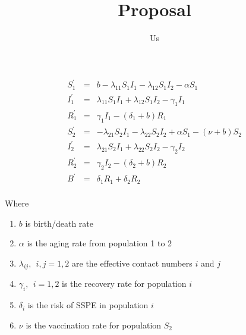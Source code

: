 \documentclass[12pt]{article}
\title{Proposal}
\author{Us}
\begin{document}
\maketitle
\begin{eqnarray*}
  S_1^{\prime}&=& b - \lambda_{11} S_1I_1 - \lambda_{12}S_1I_2-\alpha S_1 \\
  I_1^{\prime}&=&  \lambda_{11} S_1I_1 + \lambda_{12}S_1 I_2 - \gamma_1 I_1\\
  R_1^{\prime}&=& \gamma_1 I_1 -(\delta_1+b) R_1\\
  S_2^{\prime}&=&-\lambda_{21} S_2I_1 -\lambda_{22} S_2 I_2 + \alpha S_1 - (\nu+b) S_2 \\
  I_2^{\prime}&=&\lambda_{21} S_2I_1 + \lambda_{22} S_2 I_2 - \gamma_2 I_2\\
  R_2^{\prime}&=& \gamma_2 I_2 - (\delta_2+b) R_2\\
  B^{\prime}&=& \delta_1 R_1 + \delta_2 R_2 \\
\end{eqnarray*}

Where 
\begin{enumerate}[label=(\alph*)]
  \item $b$ is birth/death rate
  \item $\alpha$ is the aging rate from population 1 to 2
  \item $\lambda_{ij},~~i,j=1,2$ are the effective contact numbers $i$ and $j$
  \item $\gamma_i,~~i=1,2$ is the recovery rate for population $i$
  \item $\delta_i$ is the risk of SSPE in population $i$
  \item $\nu$ is the vaccination rate for population $S_2$
\end{enumerate}
\end{document}

